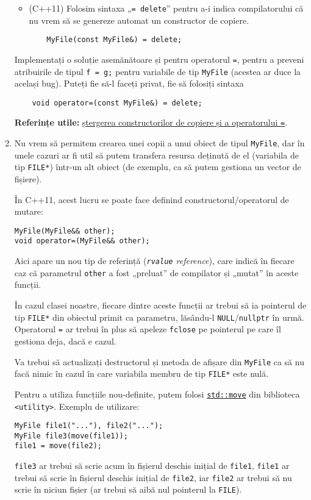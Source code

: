 \begin{enumerate}
\begin{itemize}
        \item (C++11) Folosim sintaxa „\texttt{= delete}” pentru a-i indica compilatorului că nu vrem să se genereze automat un constructor de copiere.
        \begin{lstlisting}
    MyFile(const MyFile&) = delete;
        \end{lstlisting}
    \end{itemize}

    Implementați o soluție asemănătoare și pentru operatorul \texttt{=}, pentru a preveni atribuirile de tipul \texttt{f = g;} pentru variabile de tip \texttt{MyFile} (acestea ar duce la același bug). Puteți fie să-l faceți privat, fie să folosiți sintaxa
    \begin{lstlisting}
    void operator=(const MyFile&) = delete;
    \end{lstlisting}

    \textbf{Referințe utile:} \href{https://stackoverflow.com/a/33776856/5723188}{ștergerea constructorilor de copiere și a operatorului \texttt{=}}.

    \item Nu vrem să permitem crearea unei copii a unui obiect de tipul \texttt{MyFile}, dar în unele cazuri ar fi util să putem transfera resursa deținută de el (variabila de tip \texttt{FILE*}) într-un alt obiect (de exemplu, ca să putem gestiona un vector de fișiere).

    În C++11, acest lucru se poate face definind constructorul/operatorul de mutare:
    \begin{lstlisting}
MyFile(MyFile&& other);
void operator=(MyFile&& other);
\end{lstlisting}
    Aici apare un nou tip de referință (\emph{\texttt{rvalue} reference}), care indică în fiecare caz că parametrul \texttt{other} a fost „preluat” de compilator și „mutat” în aceste funcții.

    În cazul clasei noastre, fiecare dintre aceste funcții ar trebui să ia pointerul de tip \texttt{FILE*} din obiectul primit ca parametru, lăsându-l \texttt{NULL}/\texttt{nullptr} în urmă. Operatorul \texttt{=} ar trebui în plus să apeleze \texttt{fclose} pe pointerul pe care îl gestiona deja, dacă e cazul.

    Va trebui să actualizați destructorul și metoda de afișare din \texttt{MyFile} ca să nu facă nimic în cazul în care variabila membru de tip \texttt{FILE*} este nulă.

    Pentru a utiliza funcțiile nou-definite, putem folosi \href{https://en.cppreference.com/w/cpp/utility/move}{\texttt{std::move}} din biblioteca \texttt{<utility>}. Exemplu de utilizare:
    \begin{lstlisting}
MyFile file1("..."), file2("...");
MyFile file3(move(file1));
file1 = move(file2);
    \end{lstlisting}
    \texttt{file3} ar trebui să scrie acum în fișierul deschis inițial de \texttt{file1}, \texttt{file1} ar trebui să scrie în fișierul deschis inițial de \texttt{file2}, iar \texttt{file2} ar trebui să nu scrie în niciun fișier (ar trebui să aibă nul pointerul la \texttt{FILE}).


\end{enumerate}
